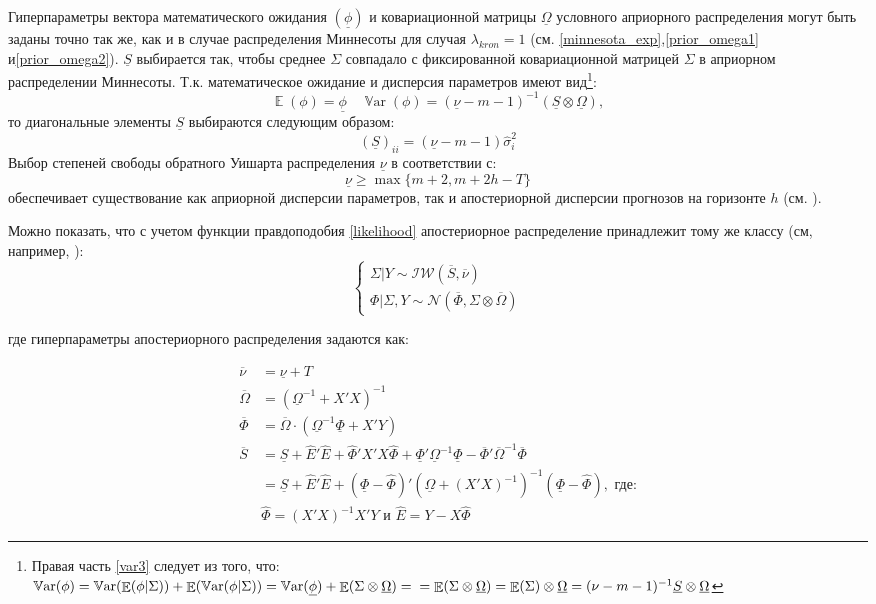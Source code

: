 \documentclass[11pt]{article} %
\DeclareMathOperator{\E}{\mathbb{E}}
\DeclareMathOperator{\Var}{\mathbb{V}\mathrm{ar}}
\newcommand{\cN}{\mathcal{N}}
\newcommand{\cIW}{\mathcal{IW}}
\newcommand{\prior}{\underline}
\newcommand{\post}{\overline}
\begin{document}
Гиперпараметры вектора математического ожидания $(\prior \phi)$ и ковариационной матрицы $\prior \Omega$ условного априорного распределения  могут быть заданы точно так же, как и в случае распределения Миннесоты для  случая $\lambda_{kron} =1$ (см. \eqref{minnesota_exp},\eqref{prior_omega1} и\eqref{prior_omega2}).
$\prior S$ выбирается так, чтобы среднее $\Sigma$ совпадало с фиксированной ковариационной матрицей $\Sigma$ в априорном распределении Миннесоты. Т.к. математическое ожидание и дисперсия параметров имеют вид\footnote{Правая часть \ref{var3} следует из того, что:
$\Var(\phi)=\Var(\E(\phi|\Sigma))+\E(\Var(\phi|\Sigma))=\Var(\prior\phi)+\E(\Sigma\otimes\prior\Omega)=\\=\E(\Sigma\otimes\prior\Omega)=\E(\Sigma)\otimes\prior\Omega=(\nu-m-1)^{-1}\prior S\otimes \prior\Omega$
}:
\begin{equation}
\E(\phi)=\prior \phi \quad \Var(\phi)=(\prior \nu - m -1)^{-1}(\prior S\otimes \prior \Omega),\label{var3}
\end{equation}
то диагональные элементы $\prior S$ выбираются следующим образом:
\begin{equation}
(\prior S)_{ii}= (\prior \nu- m- 1) \hat\sigma^2_{i}
\end{equation}
Выбор степеней свободы обратного Уишарта распределения $\prior\nu$ в соответствии с:
\begin{equation}
\prior \nu \geq\max\lbrace m+2, m+2h-T\rbrace
\end{equation}
обеспечивает существование как априорной дисперсии параметров, так и апостериорной дисперсии прогнозов на горизонте $h$ (см. \cite{kadiyala_karlsson_1997}).

Можно показать, что с учетом функции правдоподобия \eqref{likelihood} апостериорное распределение принадлежит тому же классу (см, например, \cite{zellner_1996}):
\begin{equation}
\begin{cases}
\Sigma|Y \sim \cIW(\post S, \post \nu) \\
\Phi|\Sigma,Y\sim \cN (\post \Phi, \Sigma\otimes\post \Omega)
\end{cases}
\end{equation}

где гиперпараметры апостериорного распределения задаются как:

\begin{align*}
\post\nu &=\prior \nu+T\\
\post{\Omega}&=(\prior \Omega^{-1}+X'X)^{-1}\\
\post \Phi&=\post{\Omega}\cdot (\prior \Omega^{-1}\prior \Phi+X'Y)\\
\post S&=\prior S +\hat E'\hat E+\hat \Phi'
 X'X \hat \Phi +\prior \Phi'\prior\Omega^{-1}\prior \Phi-\post \Phi'\post\Omega^{-1}\post \Phi\\&=\prior S +\hat E'\hat E + (\prior \Phi - \hat \Phi)'(\prior \Omega + (X'X)^{-1})^{-1}(\prior \Phi - \hat \Phi), \text{ где:} \\
&\hat\Phi=(X'X)^{-1}X'Y \text{ и } \hat E=Y-X\hat\Phi
\end{align*}
\end{document}
